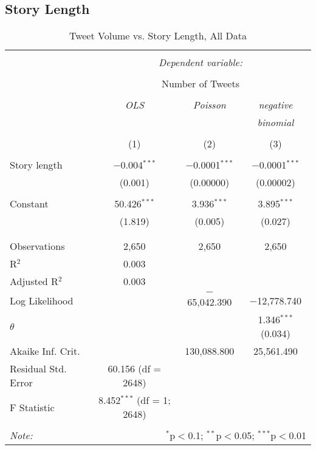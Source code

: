 \subsection{Story Length} 
\begin{table}[H] \centering 
  \caption{Tweet Volume vs. Story Length, All Data} 
  \label{} 
    \begin{tabular}{@{\extracolsep{5pt}}lccc} 
    \\[-1.8ex]\hline 
    \hline \\[-1.8ex] 
     & \multicolumn{3}{c}{\textit{Dependent variable:}} \\ 
    \cline{2-4} 
    \\[-1.8ex] & \multicolumn{3}{c}{Number of Tweets} \\ 
    \\[-1.8ex] & \textit{OLS} & \textit{Poisson} & \textit{negative} \\ 
     & \textit{} & \textit{} & \textit{binomial} \\ 
    \\[-1.8ex] & (1) & (2) & (3)\\ 
    \hline \\[-1.8ex] 
     Story length & $-$0.004$^{***}$ & $-$0.0001$^{***}$ & $-$0.0001$^{***}$ \\ 
      & (0.001) & (0.00000) & (0.00002) \\ 
      & & & \\ 
     Constant & 50.426$^{***}$ & 3.936$^{***}$ & 3.895$^{***}$ \\ 
      & (1.819) & (0.005) & (0.027) \\ 
      & & & \\ 
    \hline \\[-1.8ex] 
    Observations & 2,650 & 2,650 & 2,650 \\ 
    R$^{2}$ & 0.003 &  &  \\ 
    Adjusted R$^{2}$ & 0.003 &  &  \\ 
    Log Likelihood &  & $-$65,042.390 & $-$12,778.740 \\ 
    $\theta$ &  &  & 1.346$^{***}$  (0.034) \\ 
    Akaike Inf. Crit. &  & 130,088.800 & 25,561.490 \\ 
    Residual Std. Error & 60.156 (df = 2648) &  &  \\ 
    F Statistic & 8.452$^{***}$ (df = 1; 2648) &  &  \\ 
    \hline 
    \hline \\[-1.8ex] 
    \textit{Note:}  & \multicolumn{3}{r}{$^{*}$p$<$0.1; $^{**}$p$<$0.05; $^{***}$p$<$0.01} \\ 
    \end{tabular} 
\end{table} 

